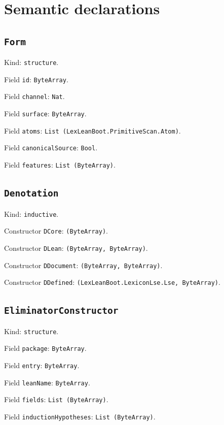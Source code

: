 \documentclass[11pt]{article}
\begin{document}
\section*{Semantic declarations}
\subsection*{\texttt{Form}}
\noindent Kind: \texttt{structure}.\par
\noindent Field \texttt{id}: \texttt{ByteArray}.\par
\noindent Field \texttt{channel}: \texttt{Nat}.\par
\noindent Field \texttt{surface}: \texttt{ByteArray}.\par
\noindent Field \texttt{atoms}: \texttt{List (LexLeanBoot.PrimitiveScan.Atom)}.\par
\noindent Field \texttt{canonicalSource}: \texttt{Bool}.\par
\noindent Field \texttt{features}: \texttt{List (ByteArray)}.\par
\subsection*{\texttt{Denotation}}
\noindent Kind: \texttt{inductive}.\par
\noindent Constructor \texttt{DCore}: \texttt{(ByteArray)}.\par
\noindent Constructor \texttt{DLean}: \texttt{(ByteArray, ByteArray)}.\par
\noindent Constructor \texttt{DDocument}: \texttt{(ByteArray, ByteArray)}.\par
\noindent Constructor \texttt{DDefined}: \texttt{(LexLeanBoot.LexiconLse.Lse, ByteArray)}.\par
\subsection*{\texttt{EliminatorConstructor}}
\noindent Kind: \texttt{structure}.\par
\noindent Field \texttt{package}: \texttt{ByteArray}.\par
\noindent Field \texttt{entry}: \texttt{ByteArray}.\par
\noindent Field \texttt{leanName}: \texttt{ByteArray}.\par
\noindent Field \texttt{fields}: \texttt{List (ByteArray)}.\par
\noindent Field \texttt{inductionHypotheses}: \texttt{List (ByteArray)}.\par
\end{document}
